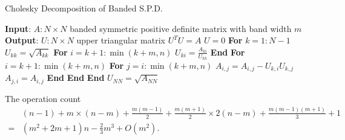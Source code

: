 \documentclass[paper=a4, fontsize=11pt]{scrartcl} %
\numberwithin{equation}{section} %
\numberwithin{figure}{section} %
\numberwithin{table}{section} %
\begin{document}
\begin{algorithm}
\caption{Cholesky Decomposition of Banded S.P.D.}\label{lstspdm}
\begin{algorithmic}
\STATE \textbf{Input}: $A: N\times N$ banded symmetric positive definite matrix with band width $m$
\STATE \textbf{Output}: $U: N\times N$ upper triangular matrix $U^T U= A$
\newline
\STATE $U=0$
\STATE \textbf{For} $k=1:N-1$
\STATE \quad $U_{kk} = \sqrt{A_{kk}}$
\STATE \quad \textbf{For} $i=k+1:\min(k+m,n)$
\STATE \quad \quad $U_{ki} = \frac{A_{ki}}{U_{kk}}$
\STATE \quad \textbf{End}
\newline
\STATE \quad \textbf{For} $i=k+1:\min(k+m,n)$
\STATE \quad \quad \textbf{For} $j=i:\min(k+m,n)$
\STATE \quad \quad \quad $A_{i,j} = A_{i,j} - U_{k,i}U_{k,j}$
\STATE \quad \quad \quad $A_{j,i} = A_{i,j}$
\STATE \quad \quad \textbf{End}
\STATE \quad \textbf{End}
\STATE \textbf{End}
\STATE $U_{NN}=\sqrt{A_{NN}}$
\end{algorithmic}
\end{algorithm}
The operation count
\begin{align}
\nonumber &(n-1)+m\times(n-m) + \frac{m(m-1)}{2} + \frac{m(m+1)}{2}\times 2(n-m) + \frac{m(m-1)(m+1)}{3} + 1\\
\nonumber =&\left(m^2+2m+1\right)n - \frac{2}{3}m^3 +O\left(m^2\right).
\end{align}
\newpage
\end{document}
